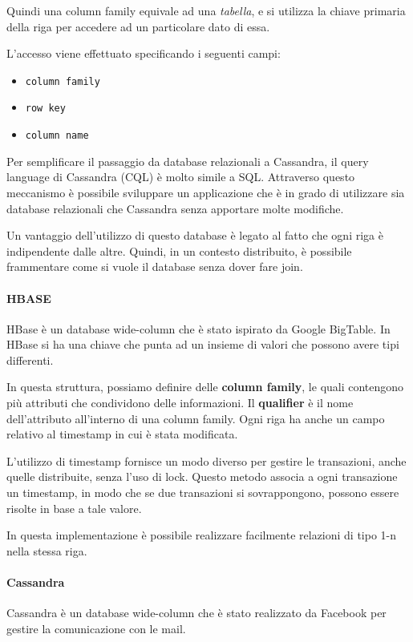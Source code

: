 Quindi una column family equivale ad una \textit{tabella}, e si utilizza la chiave
primaria della riga per accedere ad un particolare dato di essa.

L'accesso viene effettuato specificando i seguenti campi:
\begin{itemize}
      \item \texttt{column family}
      \item \texttt{row key}
      \item \texttt{column name}
\end{itemize}
Per semplificare il passaggio da database relazionali a Cassandra, il query
language di Cassandra (CQL) è molto simile a SQL. Attraverso questo meccanismo
è possibile sviluppare un applicazione che è in grado di utilizzare sia database
relazionali che Cassandra senza apportare molte modifiche.

Un vantaggio dell'utilizzo di questo database è legato al fatto che ogni riga è
indipendente dalle altre. Quindi, in un contesto distribuito, è possibile frammentare
come si vuole il database senza dover fare join.

\paragraph{HBASE}
HBase è un database wide-column che è stato ispirato da Google BigTable. In HBase
si ha una chiave che punta ad un insieme di valori che possono avere tipi differenti.

In questa struttura, possiamo definire delle \textbf{column family}, le quali
contengono più attributi che condividono delle informazioni. Il \textbf{qualifier} è
il nome dell'attributo all'interno di una column family. Ogni riga ha anche
un campo relativo al timestamp in cui è stata modificata.

L'utilizzo di timestamp fornisce un modo diverso per gestire le transazioni,
anche quelle distribuite, senza l'uso di lock. Questo metodo associa a ogni
transazione un timestamp, in modo che se due transazioni si sovrappongono,
possono essere risolte in base a tale valore.

In questa implementazione è possibile realizzare facilmente relazioni di tipo 1-n
nella stessa riga.
\paragraph{Cassandra}
Cassandra è un database wide-column che è stato realizzato da Facebook per gestire
la comunicazione con le mail.

